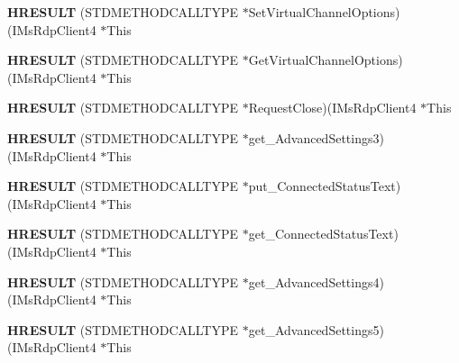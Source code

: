 \begin{DoxyCompactItemize}
{\bfseries H\+R\+E\+S\+U\+LT} (S\+T\+D\+M\+E\+T\+H\+O\+D\+C\+A\+L\+L\+T\+Y\+PE $\ast$Set\+Virtual\+Channel\+Options)(I\+Ms\+Rdp\+Client4 $\ast$This
\item 
\mbox{\label{struct_i_ms_rdp_client4_vtbl_acf135c2e77809b5587ef1ee8181b90a7}} 
{\bfseries H\+R\+E\+S\+U\+LT} (S\+T\+D\+M\+E\+T\+H\+O\+D\+C\+A\+L\+L\+T\+Y\+PE $\ast$Get\+Virtual\+Channel\+Options)(I\+Ms\+Rdp\+Client4 $\ast$This
\item 
\mbox{\label{struct_i_ms_rdp_client4_vtbl_afc86a838604a49bb5c4d83152a020255}} 
{\bfseries H\+R\+E\+S\+U\+LT} (S\+T\+D\+M\+E\+T\+H\+O\+D\+C\+A\+L\+L\+T\+Y\+PE $\ast$Request\+Close)(I\+Ms\+Rdp\+Client4 $\ast$This
\item 
\mbox{\label{struct_i_ms_rdp_client4_vtbl_a2c3a4a469e7d7d9406a33a6a9272617a}} 
{\bfseries H\+R\+E\+S\+U\+LT} (S\+T\+D\+M\+E\+T\+H\+O\+D\+C\+A\+L\+L\+T\+Y\+PE $\ast$get\+\_\+\+Advanced\+Settings3)(I\+Ms\+Rdp\+Client4 $\ast$This
\item 
\mbox{\label{struct_i_ms_rdp_client4_vtbl_a42d0b8efbf69cc7affa1fbd61798bf09}} 
{\bfseries H\+R\+E\+S\+U\+LT} (S\+T\+D\+M\+E\+T\+H\+O\+D\+C\+A\+L\+L\+T\+Y\+PE $\ast$put\+\_\+\+Connected\+Status\+Text)(I\+Ms\+Rdp\+Client4 $\ast$This
\item 
\mbox{\label{struct_i_ms_rdp_client4_vtbl_a0f83aae81448474438a65937e8fed0ba}} 
{\bfseries H\+R\+E\+S\+U\+LT} (S\+T\+D\+M\+E\+T\+H\+O\+D\+C\+A\+L\+L\+T\+Y\+PE $\ast$get\+\_\+\+Connected\+Status\+Text)(I\+Ms\+Rdp\+Client4 $\ast$This
\item 
\mbox{\label{struct_i_ms_rdp_client4_vtbl_a7f58136e435cd44f43abc4dafd7ae2a7}} 
{\bfseries H\+R\+E\+S\+U\+LT} (S\+T\+D\+M\+E\+T\+H\+O\+D\+C\+A\+L\+L\+T\+Y\+PE $\ast$get\+\_\+\+Advanced\+Settings4)(I\+Ms\+Rdp\+Client4 $\ast$This
\item 
\mbox{\label{struct_i_ms_rdp_client4_vtbl_a49dcc613580a067fbacc9467d99387b9}} 
{\bfseries H\+R\+E\+S\+U\+LT} (S\+T\+D\+M\+E\+T\+H\+O\+D\+C\+A\+L\+L\+T\+Y\+PE $\ast$get\+\_\+\+Advanced\+Settings5)(I\+Ms\+Rdp\+Client4 $\ast$This
\item 

\end{DoxyCompactItemize}
